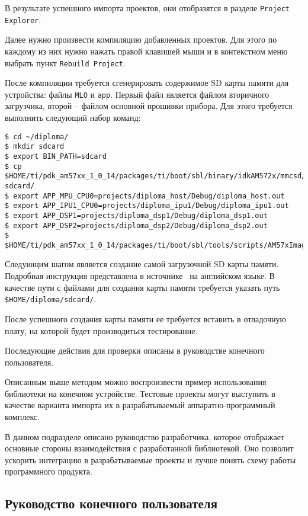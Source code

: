 В результате успешного импорта проектов, они отобразятся в разделе
\lstinline{Project Explorer}.

Далее нужно произвести компиляцию добавленных проектов. Для этого
по каждому из них нужно нажать правой клавишей мыши и в контекстном меню
выбрать пункт \lstinline{Rebuild Project}.

После компиляции требуется сгенерировать содержимое SD карты памяти для устройства:
файлы \lstinline{MLO} и \lstinline{app}. Первый файл является файлом вторичного загрузчика,
второй -- файлом основной прошивки прибора.
Для этого требуется выполнить следующий набор команд:
\begin{lstlisting}
$ cd ~/diploma/
$ mkdir sdcard
$ export BIN_PATH=sdcard
$ cp $HOME/ti/pdk_am57xx_1_0_14/packages/ti/boot/sbl/binary/idkAM572x/mmcsd/bin/MLO sdcard/
$ export APP_MPU_CPU0=projects/diploma_host/Debug/diploma_host.out
$ export APP_IPU1_CPU0=projects/diploma_ipu1/Debug/diploma_ipu1.out
$ export APP_DSP1=projects/diploma_dsp1/Debug/diploma_dsp1.out
$ export APP_DSP2=projects/diploma_dsp2/Debug/diploma_dsp2.out
$ $HOME/ti/pdk_am57xx_1_0_14/packages/ti/boot/sbl/tools/scripts/AM57xImageGen.sh
\end{lstlisting}

Следующим шагом является создание самой загрузочной SD карты памяти. Подробная
инструкция представлена в источнике~\cite{tirtos_sdcard_create_site} на
английском языке. В качестве пути с файлами для создания карты памяти
требуется указать путь \lstinline{$HOME/diploma/sdcard/}.

После успешного создания карты памяти ее требуется вставить в отладочную плату,
на которой будет производиться тестирование.

Последующие действия для проверки описаны в руководстве конечного пользователя.

Описанным выше методом можно воспроизвести пример использования библиотеки на
конечном устройстве. Тестовые проекты могут выступить в качестве варианта
импорта их в разрабатываемый аппаратно-программный комплекс.

В данном подразделе описано руководство разработчика,
которое отображает основные стороны взаимодействия с разработанной библиотекой.
Оно позволит ускорить интеграцию в разрабатываемые проекты и лучше понять
схему работы программного продукта.

\subsection{Руководство конечного пользователя}

